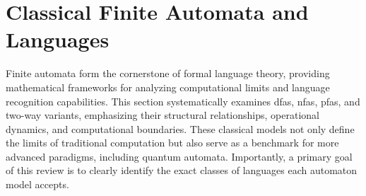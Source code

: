 \section{Classical Finite Automata and Languages} 
\label{sec:classical-finite-automata} 

Finite automata form the cornerstone of formal language theory, providing mathematical frameworks for analyzing computational limits and language recognition capabilities. This section systematically examines \glspl{dfa}, \glspl{nfa}, \glspl{pfa}, and two-way variants, emphasizing their structural relationships, operational dynamics, and computational boundaries. These classical models not only define the limits of traditional computation but also serve as a benchmark for more advanced paradigms, including quantum automata. Importantly, a primary goal of this review is to clearly identify the exact classes of languages each automaton model accepts.






